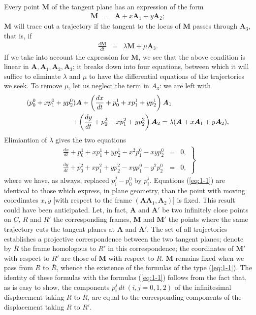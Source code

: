 Every point $\bm M$ of the tangent plane has an expression of the form
\begin{eqnarray*}
\bm M &=& \bm A + x \bm A_1 + y \bm A_2;
\end{eqnarray*}
$\bm M$ will trace out a trajectory if the tangent to the locus of $\bm M$ passes through $\bm A_3$,
that is, if
\begin{eqnarray*}
\frac{d \bm M}{dt} &=& \lambda \bm M + \mu \bm A_3 .
\end{eqnarray*}
If we take into account the expression for $\bm M$, we see that the above condition is linear in $\bm A, \bm A _1, \bm A_2 , \bm A_3$; it breaks down into four equations, between which it will suffice to eliminate $\lambda$ and $\mu$ to have the differential equations of the trajectories we seek. To remove $\mu$, let us neglect the term in $A_3$: we are left with
\begin{eqnarray*}
\lefteqn{
(p^0_0 + x p^0_1 + y p^0_2 ) \bm A + \left( \frac{d x}{dt} + p^1_0 + x p^1_1 + y p^1_2 \right) \bm A_1
 }\\ && \hspace*{2cm}
 + \left( \frac{d y}{dt} + p^2_0 + x p^2_1 + y p^2_2 \right) \bm A_2
 = \lambda( \bm A + x \bm A_1 + y \bm A_2 ) ,
\end{eqnarray*}
Elimiantion of $\lambda$ gives the two equations
\begin{eqnarray}
\left.
\begin{array}{lll}
\displaystyle \frac{dx}{dt} + p^1_0 +x p^1_1 + y p^1_2 - x^2 p^0_1 -  xy p^0_2 & =  & 0,   
\\ && \\
\displaystyle \frac{dy}{dt} + p^2_0 +x p^2_1 + y p^2_2 - xy p^0_1 -  y^2 p^0_2 & =  & 0, 
\end{array}
\right\}
\label{eq:1-1}
\end{eqnarray}
where we have, as always, replaced $p^j_i - p^0_0$ by $p^j_i$. Equations (\ref{eq:1-1}) are identical to those which express, in plane geometry,  than the point with moving coordinates $x, y$ [with respect to the frame $(\bm A \bm A_1, \bm A_2)$] is fixed. This result could have been anticipated. Let, in fact, $\bm A$ and $\bm A'$ be two infinitely close points on $C$, $R$ and $R'$ the corresponding frames, $\bm M$ and $\bm M'$ the points where the same trajectory cuts the tangent planes at $\bm  A$ and $\bm A'$. The set of all trajectories establishes a projective correspondence between the two tangent planes; denote by $\overline R$ the frame homologous to $R'$ in this correspondence; the coordinates of $\bm M'$ with respect to $R'$ are those of $\bm M$ with respect to $R$. $\bm M$ remains fixed when we pass from $R$ to $\overline R$, whence the existence of the formulas of the type (\ref{eq:1-1}). The identity of these formulas with the formulas (\ref{eq:1-1}) follows from the fact that, as is easy to show, the components $p^j_i\, dt\ (i,j=0,1,2)$ of the infinitesimal displacement taking $R$ to $\overline R$, are equal to the corresponding components of the displacement taking $R$ to $R'$. 

